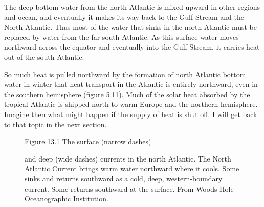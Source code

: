 The deep bottom water from the north Atlantic is mixed upward in other regions and ocean, and eventually
it makes its way back to the Gulf Stream and the North Atlantic. Thus
most of the water that sinks in the north Atlantic must be replaced by
water from the far south Atlantic. As this surface water moves
northward across the equator and eventually into the Gulf Stream, it
carries heat out of the south Atlantic.

So much heat is pulled northward by the
formation of north Atlantic bottom water in winter that heat transport
in the Atlantic is entirely northward, even in the southern hemisphere
(figure 5.11). Much of the solar heat absorbed by the tropical
Atlantic is shipped north to warm Europe and the northern
hemisphere. Imagine then what might happen if the supply of heat is
shut off. I will get back to that topic in the next section.

\begin{figure}[t!]
\footnotesize
Figure 13.1 The surface (narrow dashes) \rule{0mm}{3ex}and deep (wide
dashes) currents in the north Atlantic. The North Atlantic Current
brings warm water northward where it cools.  Some sinks and returns
southward as a cold, deep, western-boundary current. Some returns
southward at the surface. From Woods Hole Oceanographic Institution.
\label{fig:fig13-1}
\vspace{-4ex}
\end{figure}

